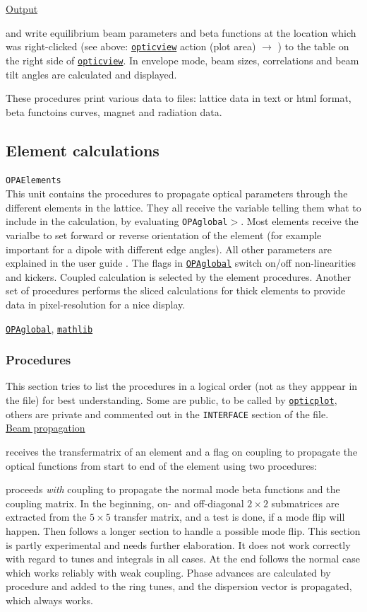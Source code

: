 \documentclass[12pt]{article}
\newcommand\code[1]{{\tt #1}}
\newcommand{\ofldx}[1]{\colorbox{black!15}{(#1)}}
\newcommand\guico[1]{{\color{blue}\code{#1}}}
\newcommand{\unico}[1]{{\color{burntorange}\code{#1}}}
\newcommand{\evcodx}[2]{\ofldx{#1} $\rightarrow$ \guico{#2}}
\newcommand{\prcod}[2]{\opauni{#1}$>$\unico{#2}}
\newcommand{\opagui}[1]{\colorbox{blue!20}{\code{#1}}}
\newcommand{\ogui}[1]{\hyperref[#1]{\opagui{#1}}}
\newcommand{\opauni}[1]{\colorbox{orange!30}{\code{#1}}}
\newcommand{\ounih}[2]{\subsection{\label{#2}#1}{\Huge\opauni{#2}}\\}
\newcommand{\ouni}[1]{\hyperref[#1]{\opauni{#1}}}
\newcommand{\uses}[1]{\flushleft {\bf Uses:} #1}
\newcommand{\desc}[1]{#1}
\newcommand{\todo}[1]{{\color{red} #1}}
\begin{document}
{\underline{Output}

\unico{FillBeamTab} and \unico{FillBetaTab} write equilibrium beam parameters and beta functions at the location which was right-clicked (see above: \ogui{opticview} action \evcodx{plot area}{pwMouseDown}) to the table on the right side of \ogui{opticview}. In envelope mode, beam sizes, correlations and beam tilt angles are calculated and displayed. 

\unico{Print\dots} These procedures print various data to files: lattice data in text or html format, beta functoins curves, magnet and radiation data.
}

\ounih{Element calculations}{OPAElements} 

\desc{This unit contains the procedures to propagate optical parameters through the different elements in the lattice. They all receive the variable \unico{mode} telling them what to include in the calculation, by evaluating \prcod{OPAglobal}{switch}. Most elements receive the varialbe \unico{idir} to set forward or reverse orientation of the element (for example important for a dipole with different edge angles). All other parameters are explained in the user guide \cite{userguide}. 
The flags \unico{UseSext,UsePulsed} in \ouni{OPAglobal} switch on/off non-linearities and kickers. Coupled calculation is selected by the element procedures. Another set of procedures performs the sliced calculations for thick elements to provide data in pixel-resolution for a nice display. 
}

\uses{\ouni{OPAglobal}, \ouni{mathlib}}

\subsubsection*{Procedures}

This section tries to list the procedures in a logical order (not as they apppear in the file) for best understanding. Some are public, to be called by \ouni{opticplot}, others are private and commented out in the \code{INTERFACE} section of the file.\\

\underline{Beam propagation}

\unico{Propagate} receives the transfermatrix of an element and a flag on coupling to propagate the optical functions from start to end of the element using two procedures:

\unico{MCC\_prop} proceeds {\em with} coupling to propagate the normal mode beta functions and the coupling matrix. In the beginning, on- and off-diagonal $2\times 2$ submatrices are extracted from the $5\times 5$ transfer matrix, and a test is done, if a mode flip will happen. Then follows a longer section to handle a possible mode flip. \todo{This section is partly experimental and needs further elaboration. It does not work correctly with regard to tunes and integrals in all cases.} At the end follows the normal case which works reliably with weak coupling. Phase advances are calculated by procedure \unico{PhaseAdvance} and added to the ring tunes, and the dispersion vector is propagated, which always works.
\end{document}
